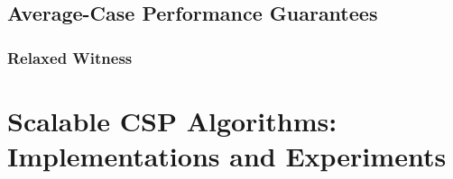 \documentclass[screen,sigconf,anonymous,review]{acmart}
\begin{document}
\subsection{Average-Case Performance Guarantees}
\label{sec:avg_hd}


\subsubsection{Relaxed Witness}
\label{sec:relaxed_witness}


\section{Scalable CSP Algorithms:\texorpdfstring{\\}{ } Implementations and Experiments}
\label{sec:numeric}





\clearpage

 

%
%
%
%
%
%
%
%
\end{document}
